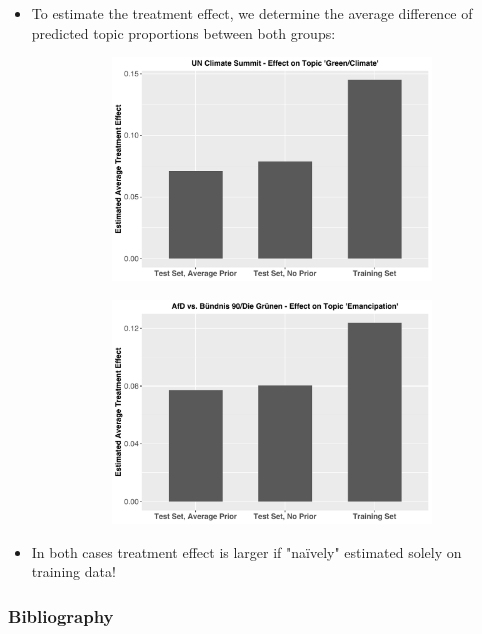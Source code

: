 \documentclass[xcolor=dvipsnames]{beamer}
\begin{document}
\begin{frame}
\begin{itemize}
\item To estimate the treatment effect, we determine the average difference of predicted topic proportions between both groups:
\begin{figure}[h!]
  \centering
  \captionsetup{justification=centering,margin=2cm}
  \begin{subfigure}[b]{0.4\linewidth}
    \includegraphics[width=\linewidth]{../../plots/presentation/climate_summit_ate.pdf}
  \end{subfigure}
  \begin{subfigure}[b]{0.4\linewidth}
    \includegraphics[width=\linewidth]{../../plots/presentation/emancipation_ate.pdf}
  \end{subfigure}
\end{figure}
\item In both cases treatment effect is larger if "na{\"i}vely" estimated solely on training data!
\end{itemize}
\end{frame}

\begin{frame}
\frametitle{Bibliography}
\printbibliography
\end{frame}
\end{document}
